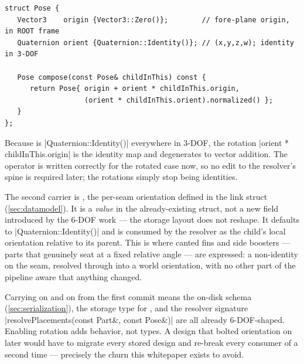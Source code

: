 \begin{listing}[htbp]
\begin{verbatim}
struct Pose {
   Vector3    origin {Vector3::Zero()};        // fore-plane origin, in ROOT frame
   Quaternion orient {Quaternion::Identity()}; // (x,y,z,w); identity in 3-DOF

   Pose compose(const Pose& childInThis) const {
      return Pose{ origin + orient * childInThis.origin,
                   (orient * childInThis.orient).normalized() };
   }
};
\end{verbatim}
\caption{ rotates the child translation by the parent orientation. With every
 equal to identity,  is the input unchanged, so
the composed pose is a pure translation --- bit-identical to the current
tree.}\label{lst:pose-compose}
\end{listing}

Because  is \cppinline|Quaternion::Identity()| everywhere in 3-DOF, the rotation
\cppinline|orient * childInThis.origin| is the identity map and  degenerates to vector
addition. The operator is written correctly for the rotated case now, so no edit to the resolver's
spine is required later; the rotations simply stop being identities.

The second carrier is , the per-seam orientation defined in the link
struct (\cref{sec:datamodel}). It is a \emph{value} in the already-existing struct, not a new field
introduced by the 6-DOF work --- the storage layout does not reshape. It defaults to
\cppinline|Quaternion::Identity()| and is consumed by the resolver as the child's local orientation
relative to its parent. This is where canted fins and side boosters --- parts that genuinely seat at
a fixed relative angle --- are expressed: a non-identity  on the seam, resolved
through  into a world orientation, with no other part of the pipeline aware that
anything changed.

\begin{keyinsight}
Carrying  on  and  on  from the first
commit means the on-disk  schema (\cref{sec:serialization}), the storage type for
, and the resolver signature \cppinline|resolvePlacements(const Part&, const Pose&)|
are all already 6-DOF-shaped. Enabling rotation adds behavior, not types. A design that bolted
orientation on later would have to migrate every stored design and re-break every consumer of
 a second time --- precisely the churn this whitepaper exists to avoid.
\end{keyinsight}

